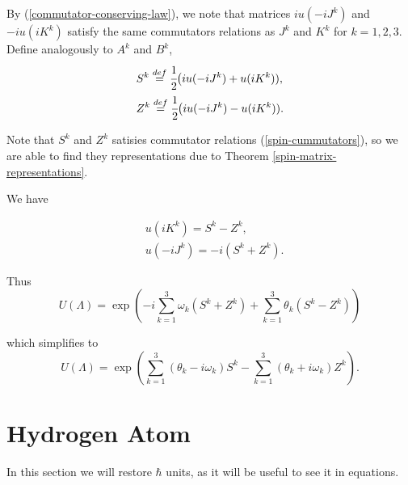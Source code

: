 \documentclass[main.tex]{subfiles}
\begin{document}
By (\ref{commutator-conserving-law}), we note that matrices $iu(-iJ^k)$ and $-iu(i K^k)$ satisfy the same commutators relations as $J^k$ and $K^k$ for $k=1,2,3$. Define analogously to $A^k$ and $B^k$,
\begin{align*}
& S^k \stackrel{def}{=} \cfrac{1}{2}\big(iu(-iJ^k) + u(i K^k)),\\
& Z^k \stackrel{def}{=} \cfrac{1}{2}\big(iu(-iJ^k) - u(i K^k)).
\end{align*}

Note that $S^k$ and $Z^k$ satisies commutator relations (\ref{spin-cummutators}), so we are able to find they representations due to Theorem \ref{spin-matrix-representations}.

We have

\begin{align}
& u(iK^k) = S^k - Z^k,\\
& u(-iJ^k) = -i(S^k + Z^k).
\end{align}

Thus
\begin{equation}
U(\Lambda) = \exp(-i\sum_{k=1}^3 \omega_k (S^k + Z^k) + \sum_{k=1}^3 \theta_k (S^k - Z^k))
\end{equation}

which simplifies to
\begin{equation}
U(\Lambda) = \exp(\sum_{k=1}^3 (\theta_k - i\omega_k) S^k - \sum_{k=1}^3 (\theta_k + i\omega_k) Z^k).
\end{equation}


\section{Hydrogen Atom}
In this section we will restore $\hbar$ units, as it will be useful to see it in equations.
\end{document}
